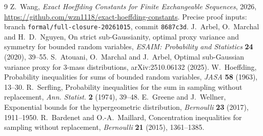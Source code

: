\documentclass[11pt]{article}
\numberwithin{equation}{section}
\theoremstyle{remark}\newtheorem{remark}[theorem]{Remark}
\begin{document}
\begin{thebibliography}{9}
 Z.~Wang, \emph{Exact Hoeffding Constants for
Finite Exchangeable Sequences}, 2026,
\url{https://github.com/wzn1118/exact-hoeffding-constants}.
Precise proof inputs: branch \texttt{formal/full-closure-20261015},
commit \texttt{8687c3d}.
 J.~Arbel, O.~Marchal and H.~D.~Nguyen,
On strict sub-Gaussianity, optimal proxy variance and
symmetry for bounded random variables,
\emph{ESAIM: Probability and Statistics} \textbf{24}
(2020), 39--55.
 S.~Atouani, O.~Marchal and J.~Arbel,
Optimal sub-Gaussian variance proxy for 3-mass
distributions, arXiv:2510.06132 (2025).
 W.~Hoeffding, Probability inequalities
for sums of bounded random variables, \emph{JASA}
\textbf{58} (1963), 13--30.
 R.~Serfling, Probability inequalities
for the sum in sampling without replacement,
\emph{Ann. Statist.} \textbf{2} (1974), 39--48.
 E.~Greene and J.~Wellner, Exponential bounds
for the hypergeometric distribution, \emph{Bernoulli}
\textbf{23} (2017), 1911--1950.
 R.~Bardenet and O.-A.~Maillard,
Concentration inequalities for sampling without
replacement, \emph{Bernoulli} \textbf{21} (2015), 1361--1385.
\end{thebibliography}
\end{document}
